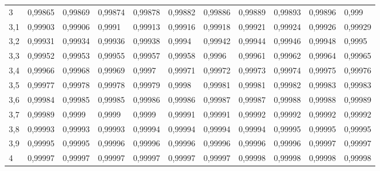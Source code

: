 \documentclass[addpoints,spanish, 12pt,a4paper]{exam}
\begin{document}
\begin{table}
\begin{tabular}{l|llllllllll}
3   & 0,99865 & 0,99869 & 0,99874 & 0,99878 & 0,99882 & 0,99886 & 0,99889 & 0,99893 & 0,99896 & 0,999   \\
3,1 & 0,99903 & 0,99906 & 0,9991  & 0,99913 & 0,99916 & 0,99918 & 0,99921 & 0,99924 & 0,99926 & 0,99929 \\
3,2 & 0,99931 & 0,99934 & 0,99936 & 0,99938 & 0,9994  & 0,99942 & 0,99944 & 0,99946 & 0,99948 & 0,9995  \\
3,3 & 0,99952 & 0,99953 & 0,99955 & 0,99957 & 0,99958 & 0,9996  & 0,99961 & 0,99962 & 0,99964 & 0,99965 \\
3,4 & 0,99966 & 0,99968 & 0,99969 & 0,9997  & 0,99971 & 0,99972 & 0,99973 & 0,99974 & 0,99975 & 0,99976 \\
3,5 & 0,99977 & 0,99978 & 0,99978 & 0,99979 & 0,9998  & 0,99981 & 0,99981 & 0,99982 & 0,99983 & 0,99983 \\
3,6 & 0,99984 & 0,99985 & 0,99985 & 0,99986 & 0,99986 & 0,99987 & 0,99987 & 0,99988 & 0,99988 & 0,99989 \\
3,7 & 0,99989 & 0,9999  & 0,9999  & 0,9999  & 0,99991 & 0,99991 & 0,99992 & 0,99992 & 0,99992 & 0,99992 \\
3,8 & 0,99993 & 0,99993 & 0,99993 & 0,99994 & 0,99994 & 0,99994 & 0,99994 & 0,99995 & 0,99995 & 0,99995 \\
3,9 & 0,99995 & 0,99995 & 0,99996 & 0,99996 & 0,99996 & 0,99996 & 0,99996 & 0,99996 & 0,99997 & 0,99997 \\
4   & 0,99997 & 0,99997 & 0,99997 & 0,99997 & 0,99997 & 0,99997 & 0,99998 & 0,99998 & 0,99998 & 0,99998
\end{tabular}
\end{table}
\restoregeometry
\end{document}
